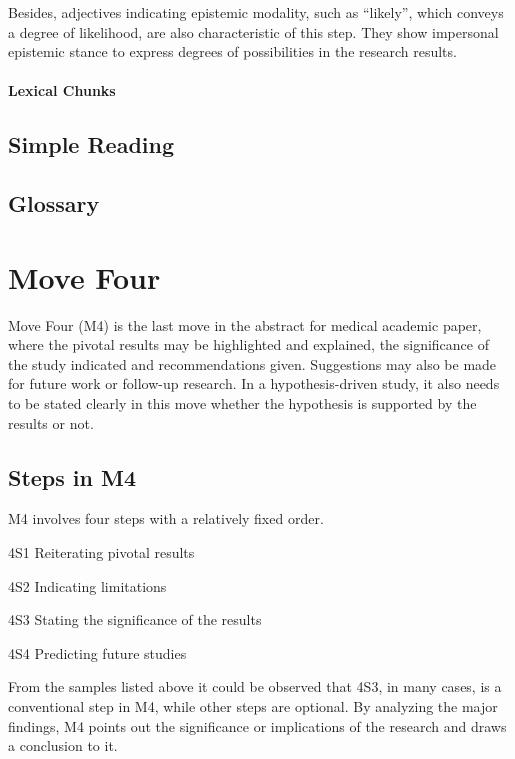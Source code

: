 \documentclass{ctexbook}
\begin{document}
    Besides, adjectives indicating epistemic modality, such as ``likely'', which conveys a degree of likelihood, are also characteristic of this step. They show impersonal epistemic stance to express degrees of possibilities in the research results.


    \subsubsection{Lexical Chunks}

\section{Simple Reading}

\section{Glossary}





\chapter{Move Four}\label{chapter6}

Move Four (M4) is the last move in the abstract for medical academic paper, where the pivotal results may be highlighted and explained, the significance of the study indicated and recommendations given. Suggestions may also be made for future work or follow-up research. In a hypothesis-driven study, it also needs to be stated clearly in this move whether the hypothesis is supported by the results or not.

\section{Steps in M4}

M4 involves four steps with a relatively fixed order.

4S1 Reiterating pivotal results

4S2 Indicating limitations

4S3 Stating the significance of the results

4S4 Predicting future studies

From the samples listed above it could be observed that 4S3, in many cases, is a conventional step in M4, while other steps are optional. By analyzing the major findings, M4 points out the significance or implications of the research and draws a conclusion to it.
\end{document}
